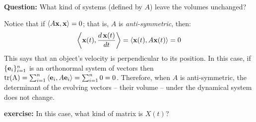 \documentclass{article}
\begin{document}
{\bf Question:\/} What kind of systems (defined by $A$) leave the volumes unchanged?

Notice that if $\left< A {\bf x}, {\bf x} \right> = 0$; that is, $A$ is
{\em anti-symmetric\/},
then:
\begin{eqnarray}
  \left< {\bf x}(t), \frac{d \, {\bf x}(t)}{dt} \right>
  = \left< {\bf x}(t), A {\bf x}(t)\right> = 0
\end{eqnarray}
This says that an object's
velocity is perpendicular to its position. In this case, if $\{{\bf e}_i\}_{i=1}^n$ is
an orthonormal system of vectors then
${\rm tr(A)} = \sum_{i=1}^n \left< {\bf e}_i, A {\bf e}_i \right> = \sum_{i=1}^n 0 = 0$.
Therefore, when $A$ is anti-symmetric, the determinant of the evolving
vectors -- their volume -- under the dynamical system does not change.

{\bf exercise:\/} In this case, what kind of matrix is $X(t)$?
\end{document}
